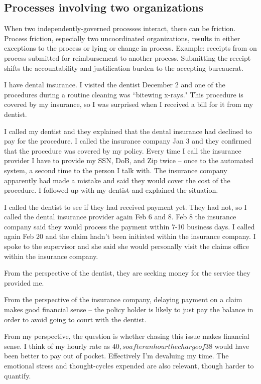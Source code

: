 \subsection{Processes involving two organizations}

When two independently-governed processes interact, there can be friction. Process friction, especially two uncoordinated organizations, results in either exceptions to the process or lying or change in process. 
Example: receipts from on process submitted for reimbursement to another process.
Submitting the receipt shifts the accountability and justification burden to the accepting bureaucrat.




I have dental insurance. I visited the dentist December 2 and one of the procedures during a routine cleaning was ``bitewing x-rays." This procedure is covered by my insurance, so I was surprised when I received a bill for it from my dentist.

I called my dentist and they explained that the dental insurance had declined to pay for the procedure. I called the insurance company Jan 3 and they confirmed that the procedure was covered by my policy. 
Every time I call the insurance provider I have to provide my SSN, DoB, and Zip twice -- once to the automated system, a second time to the person I talk with. The insurance company apparently had made a mistake and said they would cover the cost of the procedure. I followed up with my dentist and explained the situation.

I called the dentist to see if they had received payment yet. They had not, so I called the dental insurance provider again Feb 6 and 8. Feb 8 the insurance company said they would process the payment within 7-10 business days. I called again Feb 20 and the claim hadn't been initiated within the insurance company. I spoke to the supervisor and she said she would personally visit the claims office within the insurance company.

From the perspective of the dentist, they are seeking money for the service they provided me.

From the perspective of the insurance company, delaying payment on a claim makes good financial sense -- the policy holder is likely to just pay the balance in order to avoid going to court with the dentist.

From my perspective, the question is whether chasing this issue makes financial sense. I think of my hourly rate as $40, so after an hour the charge of $38 would have been better to pay out of pocket. Effectively I'm devaluing my time. The emotional stress and thought-cycles expended are also relevant, though harder to quantify.
